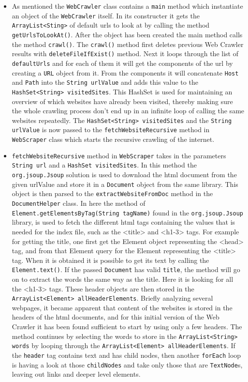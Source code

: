 \begin{itemize}
\item As mentioned the {\tt WebCrawler} class contains a {\tt main} method which instantiate an object of the {\tt WebCrawler} itself. In its constructer it gets the {\tt ArrayList<Sting>} of default urls to look at by calling the method {\tt getUrlsToLookAt()}. After the object has been created the main method calls the method {\tt crawl()}. 
The {\tt crawl()} method first deletes previous Web Crawler results with  {\tt deleteFileIfExist()} method. Next it loops through the list of {\tt defaultUrls} and for each of them it will get the components of the url by creating a {\tt URL} object from it. From the components it will concatenate {\tt Host} and {\tt Path} into the {\tt String urlValue} and adds this value to the {\tt HashSet<String> visitedSites}. This HashSet is used for maintaining an overview of which websites have already been visited, thereby making sure the whole crawling process don’t end up in an infinite loop of calling the same websites repeatedly. The {\tt HashSet<String> visitedSites} and the {\tt String urlValue} is now passed to the {\tt fetchWebsiteRecursive} method in {\tt WebScraper} class which starts the recursive crawling of the internet. 
\item {\tt fetchWebsiteRecursive} method in {\tt WebScraper} takes in the parameters {\tt String url} and a {\tt HashSet visitedSites}. In this method the {\tt org.jsoup.Jsoup} solution is used to  download the html document from the given urlValue and store it in a {\tt Document} object from the same library. This object is then parsed to the {\tt extractWebsiteFromDoc} method in the {\tt DocumentHelper} class.
In here the method of {\tt Element.getElementsByTag(String tagName)} found in the {\tt org.jsoup.Jsoup} library, is used to fetch the different html tags containing the values that is needed for the index file, such as the <title> and <h1-3> tags. For example for getting the title, one first get the Element object representing the <head> tag, and from that Element query for the Element representing the <title> tag. When it is obtained it is possible to get its text by calling the {\tt Element.text()}. 
If the passed {\tt Document} has valid {\tt title}, the method will go on to extract the words the same way as the title. Here it is looking for all the <h1-3> tags.  These header objects are then stored in the {\tt ArrayList<Element> allHeaderElements}. Briefly analyzing several webpages, it became apparent that content of the websites is stored in the headers of the html documents, and for this initial version of the Web Crawler it has been found sufficient to start by using only a few headers. The method continues by selecting the words to store in the {\tt ArrayList<String> words} by looping through the {\tt ArrayList<Element> allHeaderElements}. If the {\tt header} tag contains text and has child nodes, then another {\tt forEach} loop is having a look at those {\tt childNodes} and take only those that are {\tt TextNode}s, leaving out links and deeper level elements.

\end{itemize}
